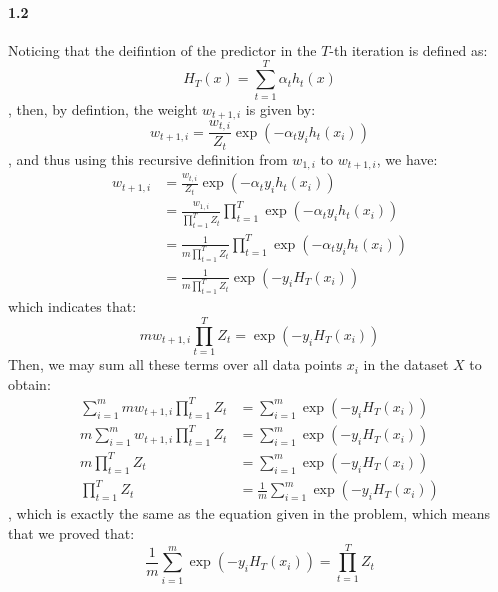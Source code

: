 \documentclass[11pt]{article}
\begin{document}
\paragraph{1.2}
Noticing that the deifintion of the predictor in the $T$-th iteration is defined as:
\begin{equation}
  H_T(x) = \sum_{t=1}^T \alpha_t h_t(x)
\end{equation}
, then, by defintion, the weight $w_{t+1,i}$ is given by:
\begin{equation}
  w_{t+1, i} = \frac{w_{t,i}}{Z_t} \exp(-\alpha_t y_i h_t(x_i))
\end{equation}
, and thus using this recursive definition from $w_{1, i}$ to $w_{t+1, i}$, we have:
\begin{equation}
\begin{split}
 w_{t+1,i} &= \frac{w_{t,i}}{Z_t} \exp(-\alpha_t y_i h_t(x_i)) \\
&= \frac{w_{1,i}}{\prod_{t=1}^{T} Z_t} \prod_{t=1}^{T} \exp(-\alpha_t y_i h_t(x_i)) \\ 
&=\frac{1}{m\prod_{t=1}^{T} Z_t} \prod_{t=1}^{T} \exp(-\alpha_t y_i h_t(x_i)) \\
&= \frac{1}{m\prod_{t=1}^T Z_t}\exp(-y_iH_T(x_i))
\end{split}
\end{equation}
which indicates that:
\begin{equation}
  mw_{t+1,i} \prod_{t=1}^T Z_t= \exp(-y_iH_T(x_i))
\end{equation}
Then, we may sum all these terms over all data points $x_i$ in the dataset $X$ to obtain:
\begin{equation}
  \begin{split}
    \sum_{i=1}^m mw_{t+1,i} \prod_{t=1}^T Z_t &= \sum_{i=1}^m \exp(-y_iH_T(x_i))  \\
   m\sum_{i=1}^m w_{t+1,i} \prod_{t=1}^T Z_t &= \sum_{i=1}^m \exp(-y_iH_T(x_i))  \\
   m\prod_{t=1}^T Z_t &= \sum_{i=1}^m \exp(-y_iH_T(x_i))  \\
    \prod_{t=1}^T Z_t &= \frac{1}{m}\sum_{i=1}^m \exp(-y_iH_T(x_i))
  \end{split}
\end{equation}
, which is exactly the same as the equation given in the problem, which means that we proved that:
\begin{equation}
  \frac{1}{m}\sum_{i=1}^m \exp(-y_iH_T(x_i)) = \prod_{t=1}^T Z_t
\end{equation}
\end{document}
